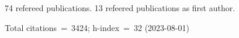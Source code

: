 74 refereed publications. 13 refeered publications as first author.

Total citations~=~3424; h-index~=~32 (2023-08-01)